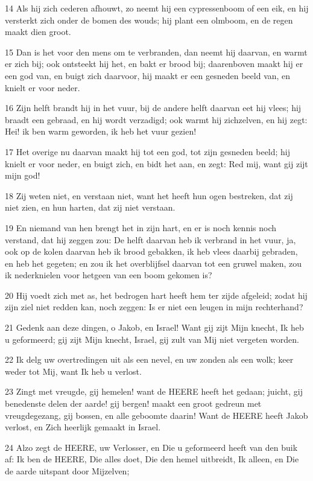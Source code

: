 \par 14 Als hij zich cederen afhouwt, zo neemt hij een cypressenboom of een eik, en hij versterkt zich onder de bomen des wouds; hij plant een olmboom, en de regen maakt dien groot.
\par 15 Dan is het voor den mens om te verbranden, dan neemt hij daarvan, en warmt er zich bij; ook ontsteekt hij het, en bakt er brood bij; daarenboven maakt hij er een god van, en buigt zich daarvoor, hij maakt er een gesneden beeld van, en knielt er voor neder.
\par 16 Zijn helft brandt hij in het vuur, bij de andere helft daarvan eet hij vlees; hij braadt een gebraad, en hij wordt verzadigd; ook warmt hij zichzelven, en hij zegt: Hei! ik ben warm geworden, ik heb het vuur gezien!
\par 17 Het overige nu daarvan maakt hij tot een god, tot zijn gesneden beeld; hij knielt er voor neder, en buigt zich, en bidt het aan, en zegt: Red mij, want gij zijt mijn god!
\par 18 Zij weten niet, en verstaan niet, want het heeft hun ogen bestreken, dat zij niet zien, en hun harten, dat zij niet verstaan.
\par 19 En niemand van hen brengt het in zijn hart, en er is noch kennis noch verstand, dat hij zeggen zou: De helft daarvan heb ik verbrand in het vuur, ja, ook op de kolen daarvan heb ik brood gebakken, ik heb vlees daarbij gebraden, en heb het gegeten; en zou ik het overblijfsel daarvan tot een gruwel maken, zou ik nederknielen voor hetgeen van een boom gekomen is?
\par 20 Hij voedt zich met as, het bedrogen hart heeft hem ter zijde afgeleid; zodat hij zijn ziel niet redden kan, noch zeggen: Is er niet een leugen in mijn rechterhand?
\par 21 Gedenk aan deze dingen, o Jakob, en Israel! Want gij zijt Mijn knecht, Ik heb u geformeerd; gij zijt Mijn knecht, Israel, gij zult van Mij niet vergeten worden.
\par 22 Ik delg uw overtredingen uit als een nevel, en uw zonden als een wolk; keer weder tot Mij, want Ik heb u verlost.
\par 23 Zingt met vreugde, gij hemelen! want de HEERE heeft het gedaan; juicht, gij benedenste delen der aarde! gij bergen! maakt een groot gedreun met vreugdegezang, gij bossen, en alle geboomte daarin! Want de HEERE heeft Jakob verlost, en Zich heerlijk gemaakt in Israel.
\par 24 Alzo zegt de HEERE, uw Verlosser, en Die u geformeerd heeft van den buik af: Ik ben de HEERE, Die alles doet, Die den hemel uitbreidt, Ik alleen, en Die de aarde uitspant door Mijzelven;

